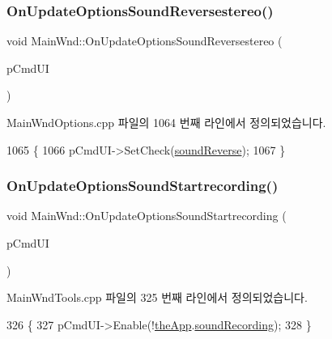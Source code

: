 \subsubsection{\texorpdfstring{On\+Update\+Options\+Sound\+Reversestereo()}{OnUpdateOptionsSoundReversestereo()}}
{\footnotesize\ttfamily void Main\+Wnd\+::\+On\+Update\+Options\+Sound\+Reversestereo (\begin{DoxyParamCaption}\item[{C\+Cmd\+UI $\ast$}]{p\+Cmd\+UI }\end{DoxyParamCaption})\hspace{0.3cm}{\ttfamily [protected]}}



Main\+Wnd\+Options.\+cpp 파일의 1064 번째 라인에서 정의되었습니다.


\begin{DoxyCode}
1065 \{
1066   pCmdUI->SetCheck(\mbox{\hyperlink{gb_sound_8cpp_a34a44cbcbdf585c7e2f1e17948600c1f}{soundReverse}});
1067 \}
\end{DoxyCode}
\mbox{\label{class_main_wnd_afe112a4df6bc333e8b7e6ffc3521fe5f}} 
\subsubsection{\texorpdfstring{On\+Update\+Options\+Sound\+Startrecording()}{OnUpdateOptionsSoundStartrecording()}}
{\footnotesize\ttfamily void Main\+Wnd\+::\+On\+Update\+Options\+Sound\+Startrecording (\begin{DoxyParamCaption}\item[{C\+Cmd\+UI $\ast$}]{p\+Cmd\+UI }\end{DoxyParamCaption})\hspace{0.3cm}{\ttfamily [protected]}}



Main\+Wnd\+Tools.\+cpp 파일의 325 번째 라인에서 정의되었습니다.


\begin{DoxyCode}
326 \{
327   pCmdUI->Enable(!\mbox{\hyperlink{_v_b_a_8cpp_a8095a9d06b37a7efe3723f3218ad8fb3}{theApp}}.\mbox{\hyperlink{class_v_b_a_ae4be99a1a898dc5a3fceed0edeb0c1b0}{soundRecording}});
328 \}
\end{DoxyCode}
\mbox{\label{class_main_wnd_af54c122c1f7c4787b8441f35384da473}} 
